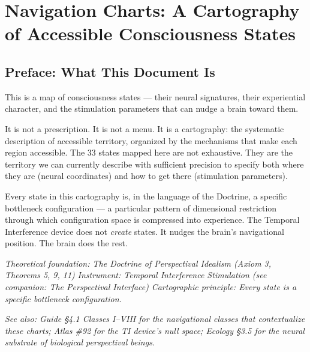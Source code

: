 \chapter*{Navigation Charts: A Cartography of Accessible Consciousness States}



\bigskip\noindent\makebox[\textwidth]{\color{rulegray}\rule{5cm}{0.3pt}}\bigskip


\section*{Preface: What This Document Is}


This is a map of consciousness states — their neural signatures, their experiential character, and the stimulation parameters that can nudge a brain toward them.


It is not a prescription. It is not a menu. It is a cartography: the systematic description of accessible territory, organized by the mechanisms that make each region accessible. The 33 states mapped here are not exhaustive. They are the territory we can currently describe with sufficient precision to specify both where they are (neural coordinates) and how to get there (stimulation parameters).


Every state in this cartography is, in the language of the Doctrine, a specific bottleneck configuration — a particular pattern of dimensional restriction through which configuration space is compressed into experience. The Temporal Interference device does not \textit{create} states. It nudges the brain's navigational position. The brain does the rest.


\textit{Theoretical foundation: The Doctrine of Perspectival Idealism (Axiom 3, Theorems 5, 9, 11)} \textit{Instrument: Temporal Interference Stimulation (see companion: The Perspectival Interface)} \textit{Cartographic principle: Every state is a specific bottleneck configuration.}


\textit{See also: Guide §4.1 Classes I–VIII for the navigational classes that contextualize these charts; Atlas \#92 for the TI device's null space; Ecology §3.5 for the neural substrate of biological perspectival beings.}


\bigskip\noindent\makebox[\textwidth]{\color{rulegray}\rule{5cm}{0.3pt}}\bigskip


